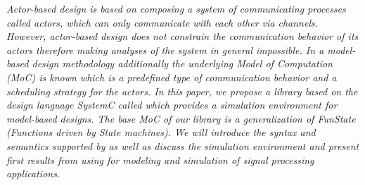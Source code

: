 {\itshape
Actor-based design is based on composing a system of communicating processes called \emph{actors}, which can only communicate with each other via channels.
However, \emph{actor-based design} does not constrain the communication behavior of its actors therefore making analyses of the system in general impossible.
In a \emph{model-based design} methodology additionally the underlying \emph{Model of Computation} (MoC) is known which is a predefined type of communication behavior and a scheduling strategy for the actors.
In this paper, we propose a library based on the design language SystemC called \SysteMoC{} which provides a simulation environment for model-based designs.
The base MoC of our library is a generalization of \emph{FunState} (Functions driven by State machines).
We will introduce the syntax and semantics supported by \SysteMoC{} as well as discuss the simulation environment and present first results from using \SysteMoC{} for modeling and simulation of signal processing applications.
}


